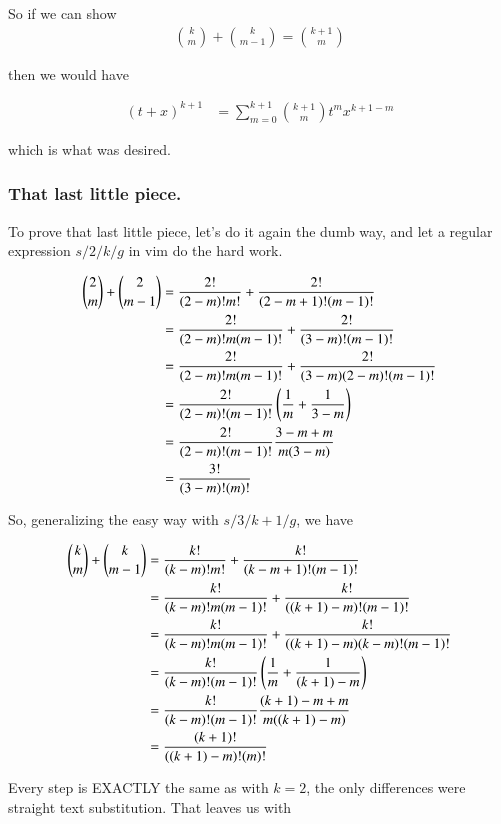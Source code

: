 So if we can show
\begin{align*}
\binom{k}{m} + \binom{k}{m-1} = \binom{k+1}{m}
\end{align*}

then we would have

\begin{align*}
(t + x)^{k+1}
&= \sum_{m=0}^{k+1} \binom{k+1}{m} t^{m} x^{k + 1 - m}
\end{align*}

which is what was desired.

\subsubsection{That last little piece.}

To prove that last little piece, let's do it again the dumb way, and let a regular expression $s/2/k/g$ in vim do the hard work.

\begin{align*}
\binom{2}{m} + \binom{2}{m-1}
&=
\frac{2!}{(2-m)!m!}
+ \frac{2!}{(2-m + 1)!(m-1)!} \\
&=
\frac{2!}{(2-m)!m(m-1)!}
+ \frac{2!}{(3-m)!(m-1)!} \\
&=
\frac{2!}{(2-m)!m(m-1)!}
+ \frac{2!}{(3-m)(2-m)!(m-1)!} \\
&=
\frac{2!}{(2-m)!(m-1)!} \left( \frac{1}{m} + \frac{1}{3-m}\right) \\
&=
\frac{2!}{(2-m)!(m-1)!} \frac{3 -m + m }{m(3-m)} \\
&=
\frac{3!}{(3-m)!(m)!} \\
\end{align*}

So, generalizing the easy way with $s/3/k+1/g$, we have 

\begin{align*}
\binom{k}{m} + \binom{k}{m-1}
&=
\frac{k!}{(k-m)!m!}
+ \frac{k!}{(k-m + 1)!(m-1)!} \\
&=
\frac{k!}{(k-m)!m(m-1)!}
+ \frac{k!}{((k+1)-m)!(m-1)!} \\
&=
\frac{k!}{(k-m)!m(m-1)!}
+ \frac{k!}{((k+1)-m)(k-m)!(m-1)!} \\
&=
\frac{k!}{(k-m)!(m-1)!} \left( \frac{1}{m} + \frac{1}{(k+1)-m}\right) \\
&=
\frac{k!}{(k-m)!(m-1)!} \frac{(k+1) -m + m }{m((k+1)-m)} \\
&=
\frac{(k+1)!}{((k+1)-m)!(m)!} \\
\end{align*}

Every step is EXACTLY the same as with $k=2$, the only differences were straight text substitution.  That leaves us with


